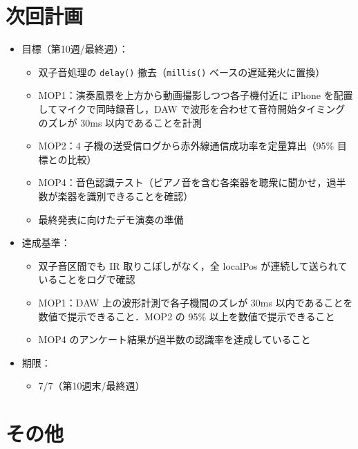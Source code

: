 \documentclass[a4paper,11pt]{ltjsarticle}
\providecommand{\％}{\%}
\begin{document}
\section{次回計画}\label{sec:next}

\begin{itemize}
    \item 目標（第10週/最終週）：
    \begin{itemize}
        \item 双子音処理の \texttt{delay()} 撤去（\texttt{millis()} ベースの遅延発火に置換）
        \item MOP1：演奏風景を上方から動画撮影しつつ各子機付近に iPhone を配置してマイクで同時録音し，DAW で波形を合わせて音符開始タイミングのズレが 30ms 以内であることを計測
        \item MOP2：4 子機の送受信ログから赤外線通信成功率を定量算出（95\% 目標との比較）
        \item MOP4：音色認識テスト（ピアノ音を含む各楽器を聴衆に聞かせ，過半数が楽器を識別できることを確認）
        \item 最終発表に向けたデモ演奏の準備
    \end{itemize}
    \item 達成基準：
    \begin{itemize}
        \item 双子音区間でも IR 取りこぼしがなく，全 localPos が連続して送られていることをログで確認
        \item MOP1：DAW 上の波形計測で各子機間のズレが 30ms 以内であることを数値で提示できること．MOP2 の 95\% 以上を数値で提示できること
        \item MOP4 のアンケート結果が過半数の認識率を達成していること
    \end{itemize}
    \item 期限：
    \begin{itemize}
        \item 7/7（第10週末/最終週）
    \end{itemize}
\end{itemize}

\section{その他}\label{sec:other}
\end{document}
